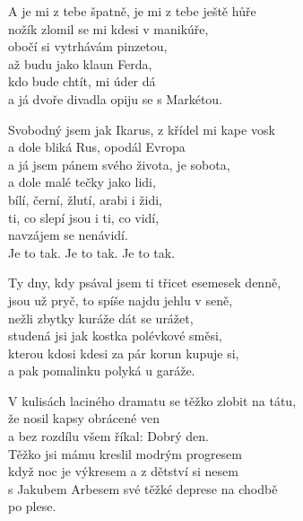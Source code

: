 
\ve
{}A je mi z tebe špatně, je mi z tebe ještě hůře\\
nožík zlomil se mi kdesi v manikúře, \\
obočí si vytrhávám pinzetou, \\
až budu jako klaun Ferda, \\
kdo bude chtít, mi úder dá \\
a já dvoře divadla opiju se s Markétou. 

\cho
Svobodný jsem jak Ikarus, z křídel mi kape vosk \\
a dole bliká Rus, opodál Evropa \\
a já jsem pánem svého života, je sobota, \\
a dole malé tečky jako lidi, \\
bílí, černí, žlutí, arabi i židi, \\
ti, co slepí jsou i ti, co vidí,  \\
navzájem se nenávidí. \\
Je to tak. Je to tak. Je to tak. 

\ve
Ty dny, kdy psával jsem ti třicet esemesek denně, \\
jsou už pryč, to spíše najdu jehlu v seně, \\
nežli zbytky kuráže dát se urážet, \\
studená jsi jak kostka polévkové směsi,\\
kterou kdosi kdesi za pár korun kupuje si, \\
a pak pomalinku polyká u garáže. 


\ve
V kulisách laciného dramatu se těžko zlobit na tátu, \\
že nosil kapsy obrácené ven \\
a bez rozdílu všem říkal: Dobrý den. \\
Těžko jsi mámu kreslil modrým progresem \\
když noc je výkresem a z dětství si nesem \\
s Jakubem Arbesem své těžké deprese na chodbě \\
po plese. 



\esong
